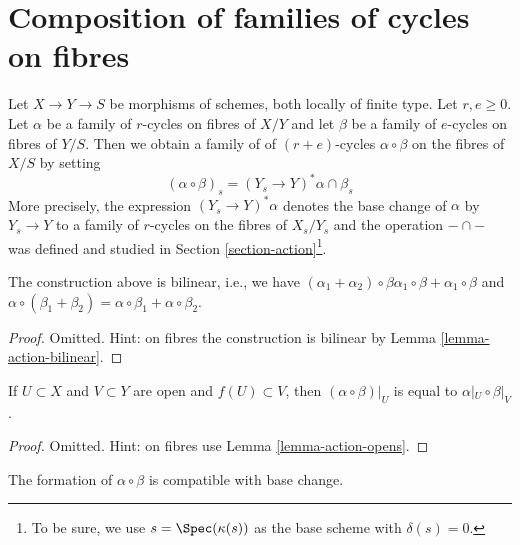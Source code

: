 \section{Composition of families of cycles on fibres}
\label{section-compose-families}

\noindent
Let $X \to Y \to S$ be morphisms of schemes, both locally of finite type.
Let $r, e \geq 0$. Let $\alpha$ be a family of $r$-cycles
on fibres of $X/Y$ and let $\beta$ be a family of $e$-cycles on
fibres of $Y/S$. Then we obtain a family of 
of $(r + e)$-cycles $\alpha \circ \beta$ on the fibres of $X/S$
by setting
$$
(\alpha \circ \beta)_s = (Y_s \to Y)^*\alpha \cap \beta_s
$$
More precisely, the expression $(Y_s \to Y)^*\alpha$ denotes
the base change of $\alpha$ by $Y_s \to Y$ to a family of $r$-cycles
on the fibres of $X_s/Y_s$ and the operation $- \cap -$
was defined and studied in Section \ref{section-action}\footnote{To be sure,
we use $s = \Spec(\kappa(s))$ as the base scheme with $\delta(s) = 0$.}.

\begin{lemma}
\label{lemma-construction-bilinear}
The construction above is bilinear, i.e., we have
$(\alpha_1 + \alpha_2) \circ \beta \alpha_1 \circ \beta +
\alpha_1 \circ \beta$ and $\alpha \circ (\beta_1 + \beta_2) =
\alpha \circ \beta_1 + \alpha \circ \beta_2$.
\end{lemma}

\begin{proof}
Omitted. Hint: on fibres the construction is bilinear
by Lemma \ref{lemma-action-bilinear}.
\end{proof}

\begin{lemma}
\label{lemma-construction-opens}
If $U \subset X$ and $V \subset Y$ are open and $f(U) \subset V$, then
$(\alpha \circ \beta)|_U$ is equal to $\alpha|_U \circ \beta|_V$.
\end{lemma}

\begin{proof}
Omitted. Hint: on fibres use
Lemma \ref{lemma-action-opens}.
\end{proof}

\begin{lemma}
\label{lemma-construction-base-change}
The formation of $\alpha \circ \beta$ is compatible with base change.
\end{lemma}

